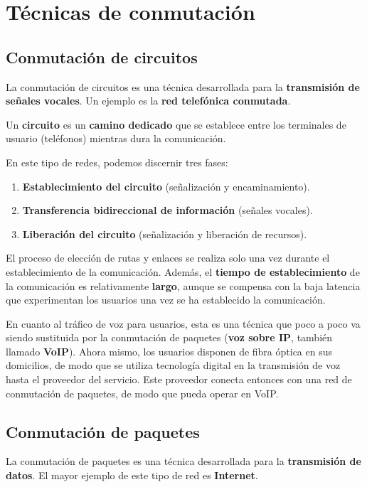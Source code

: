 \documentclass[a4paper]{book}
\begin{document}
\section{Técnicas de conmutación}
\subsection{Conmutación de circuitos}
La conmutación de circuitos es una técnica desarrollada para la \textbf{transmisión de señales vocales}. Un ejemplo es la \textbf{red telefónica conmutada}.

Un \textbf{circuito} es un \textbf{camino dedicado} que se establece entre los terminales de usuario (teléfonos) mientras dura la comunicación.

En este tipo de redes, podemos discernir tres fases:
\begin{enumerate}
  \item \textbf{Establecimiento del circuito} (señalización y encaminamiento).
  \item  \textbf{Transferencia bidireccional de información} (señales vocales).
  \item  \textbf{Liberación del circuito} (señalización y liberación de recursos).
\end{enumerate}

El proceso de elección de rutas y enlaces se realiza solo una vez durante el establecimiento de la comunicación. Además, el \textbf{tiempo de establecimiento} de la comunicación es relativamente \textbf{largo}, aunque se compensa con la baja latencia que experimentan los usuarios una vez se ha establecido la comunicación.

En cuanto al tráfico de voz para usuarios, esta es una técnica que poco a poco va siendo sustituida por la conmutación de paquetes (\textbf{voz sobre IP}, también llamado \textbf{VoIP}). Ahora mismo, los usuarios disponen de fibra óptica en sus domicilios, de modo que se utiliza tecnología digital en la transmisión de voz hasta el proveedor del servicio. Este proveedor conecta entonces con una red de conmutación de paquetes, de modo que pueda operar en VoIP.

\subsection{Conmutación de paquetes}
La conmutación de paquetes es una técnica desarrollada para la \textbf{transmisión de datos}. El mayor ejemplo de este tipo de red es \textbf{Internet}.
\end{document}
